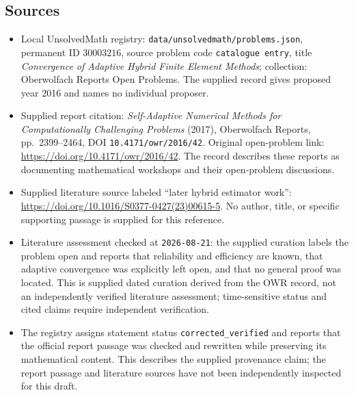 \documentclass[11pt]{article}
\begin{document}
\subsection{Sources}
\begin{itemize}
\item Local UnsolvedMath registry: \texttt{data/unsolvedmath/problems.json}, permanent ID \(30003216\), source problem code \texttt{catalogue entry}, title \emph{Convergence of Adaptive Hybrid Finite Element Methods}; collection: Oberwolfach Reports Open Problems. The supplied record gives proposed year 2016 and names no individual proposer.
\item Supplied report citation: \emph{Self-Adaptive Numerical Methods for Computationally Challenging Problems} (2017), Oberwolfach Reports, pp.\ 2399--2464, DOI \texttt{10.4171/owr/2016/42}. Original open-problem link: \url{https://doi.org/10.4171/owr/2016/42}. The record describes these reports as documenting mathematical workshops and their open-problem discussions.
\item Supplied literature source labeled ``later hybrid estimator work'': \url{https://doi.org/10.1016/S0377-0427(23)00615-5}. No author, title, or specific supporting passage is supplied for this reference.
\item Literature assessment checked at \texttt{2026-08-21}: the supplied curation labels the problem open and reports that reliability and efficiency are known, that adaptive convergence was explicitly left open, and that no general proof was located. This is supplied dated curation derived from the OWR record, not an independently verified literature assessment; time-sensitive status and cited claims require independent verification.
\item The registry assigns statement status \texttt{corrected\_verified} and reports that the official report passage was checked and rewritten while preserving its mathematical content. This describes the supplied provenance claim; the report passage and literature sources have not been independently inspected for this draft.
\end{itemize}
\end{document}

